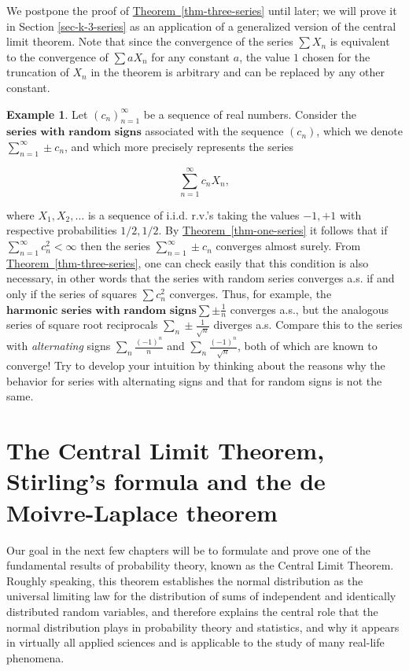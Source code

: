 \documentclass[11pt]{report}
\theoremstyle{plain}
\theoremstyle{definition}
\newtheorem{example}[thm]{Example}
\begin{document}
\noindent We postpone the proof of \hyperref[thm-three-series]{Theorem~\ref*{thm-three-series}}
until later; we will prove it in Section
\ref{sec-k-3-series} as an application of a generalized
version of the central limit theorem. Note that since
the convergence of the series $\sum X_n$ is
equivalent to the convergence of $\sum a X_n$ for any
constant $a$, the value $1$ chosen for the truncation
of $X_n$ in the theorem is arbitrary and can be
replaced by any other constant.

\begin{example}
Let $(c_n)_{n=1}^\infty$ be a sequence of real
numbers. Consider the
$\textbf{series with random signs}$ associated with
the sequence $(c_n)$, which we denote
$\sum_{n=1}^\infty \pm c_n$, and which more precisely
represents the series

\[
\sum_{n=1}^\infty c_n X_n,
\]

\noindent where $X_1, X_2, \ldots$ is a sequence of i.i.d.
r.v.'s taking the values $-1,+1$ with respective
probabilities $1/2,1/2$. By \hyperref[thm-one-series]{Theorem~\ref*{thm-one-series}}
it follows that if $\sum_{n=1}^\infty c_n^2 < \infty$
then the series $\sum_{n=1}^\infty \pm c_n$ converges
almost surely. From \hyperref[thm-three-series]{Theorem~\ref*{thm-three-series}}, one
can check easily that this condition is also
necessary, in other words that the series with random
series converges a.s. if and only if the series of
squares $\sum c_n^2$ converges. Thus, for example,
the $\textbf{harmonic series with random signs}$$\sum \pm \frac{1}{n}$ converges a.s., but the
analogous series of square root reciprocals
$\sum_n \pm \frac{1}{\sqrt{n}}$ diverges a.s. Compare
this to the series with \emph{alternating} signs
$\sum_n \frac{(-1)^n}{n}$ and
$\sum_n \frac{(-1)^n}{\sqrt{n}}$, both of which are
known to converge! Try to develop your intuition by
thinking about the reasons why the behavior for series
with alternating signs and that for random signs is
not the same.
\end{example}

\chapter{The Central Limit Theorem, Stirling’s formula and the de Moivre-Laplace theorem}

Our goal in the next few chapters will be to
formulate and prove one of the fundamental results of
probability theory, known as the Central Limit
Theorem. Roughly speaking, this theorem establishes
the normal distribution as the universal limiting law
for the distribution of sums of independent and
identically distributed random variables, and
therefore explains the central role that the normal
distribution plays in probability theory and
statistics, and why it appears in virtually all
applied sciences and is applicable to the study of
many real-life phenomena.
\end{document}

